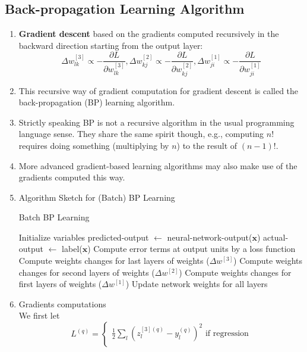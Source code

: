 \documentclass[11pt]{article}
\newcommand\pddx[2]{\frac{\partial{#1}}{\partial{#2}}}
\begin{document}
\subsection{Back-propagation Learning Algorithm}
\begin{enumerate}
\item \textbf{Gradient descent} based on the gradients computed recursively in the backward direction starting from the output layer:
$$\Delta w^{[3]}_{lk} \propto - \pddx{L}{w_{lk}^{[3]}}, \Delta w^{[2]}_{kj} \propto - \pddx{L}{w_{kj}^{[2]}}, \Delta w^{[1]}_{ji} \propto - \pddx{L}{w_{ji}^{[1]}}$$
\item This recursive way of gradient computation for gradient descent is called the back-propagation (BP) learning algorithm.
\item Strictly speaking BP is not a recursive algorithm in the usual programming language sense. They share the same spirit though, e.g., computing $n!$ requires doing something (multiplying by $n$) to the result of $(n-1)!$.
\item More advanced gradient-based learning algorithms may also make use of the gradients computed this way.
\item Algorithm Sketch for (Batch) BP Learning
\begin{algorithm}
    \caption{Batch BP Learning}
    \begin{algorithmic}[1]
        \State Initialize variables
        \Repeat
        		\State predicted-output $\gets$ neural-network-output($\mathbf{x}$) 
        		\State actual-output $\gets$ label($\mathbf{x}$)
        		\State Compute error terms at output units by a loss function  
        		\State
        		\State Compute weights changes for last layers of weights ($\Delta w^{[3]}$) 
        		\State Compute weights changes for second layers of weights ($\Delta w^{[2]}$)
        		\State Compute weights changes for first layers of weights ($\Delta w^{[1]}$)
        	\EndFor
            \State Update network weights for all layers
    \end{algorithmic}
\end{algorithm}
\item Gradients computations\\
We first let $$L^{(q)} = \begin{cases} 
\frac{1}{2} \sum_{l} (z_{l}^{[3](q)}-y_{l}^{(q)})^2 \text{ if regression}\\

\end{cases}$$
\end{enumerate}
\end{document}
